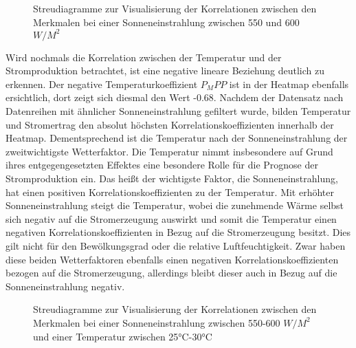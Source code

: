 \documentclass[12pt, a4paper]{article}
\begin{document}
\begin{figure}
\centering
\def\svgwidth{450pt}

\caption{Streudiagramme zur Visualisierung der Korrelationen zwischen den Merkmalen bei einer Sonneneinstrahlung zwischen 550 und 600 $W/ M^2$}
\label{fig:pairplot_filtered}
\end {figure}

Wird nochmals die Korrelation zwischen der Temperatur und der Stromproduktion betrachtet, ist eine negative lineare Beziehung deutlich zu erkennen. Der negative Temperaturkoeffizient $P_MPP$ ist in der Heatmap ebenfalls ersichtlich, dort zeigt sich diesmal den Wert -0.68. Nachdem der Datensatz nach Datenreihen mit ähnlicher Sonneneinstrahlung gefiltert wurde, bilden Temperatur und Stromertrag den absolut höchsten Korrelationskoeffizienten innerhalb der Heatmap. Dementsprechend ist die Temperatur nach der Sonneneinstrahlung der zweitwichtigste Wetterfaktor. Die Temperatur nimmt insbesondere auf Grund ihres entgegengesetzten Effektes eine besondere Rolle für die Prognose der Stromproduktion ein. Das heißt der wichtigste Faktor, die Sonneneinstrahlung, hat einen positiven Korrelationskoeffizienten zu der Temperatur. Mit erhöhter Sonneneinstrahlung steigt die Temperatur, wobei die zunehmende Wärme selbst sich negativ auf die Stromerzeugung auswirkt und somit die Temperatur einen negativen Korrelationskoeffizienten in Bezug auf die Stromerzeugung besitzt. Dies gilt nicht für den Bewölkungsgrad oder die relative Luftfeuchtigkeit. Zwar haben diese beiden Wetterfaktoren ebenfalls einen negativen Korrelationskoeffizienten bezogen auf die Stromerzeugung, allerdings bleibt dieser auch in Bezug auf die Sonneneinstrahlung negativ.

\begin{figure}
\centering
\def\svgwidth{425pt}

\caption{Streudiagramme zur Visualisierung der Korrelationen zwischen den Merkmalen bei einer Sonneneinstrahlung zwischen 550-600 $W/ M^2$ und einer Temperatur zwischen 25°C-30°C}
\label{fig:pairplot_filtered_radiation_temperature_1200}
\end {figure}
\end{document}
